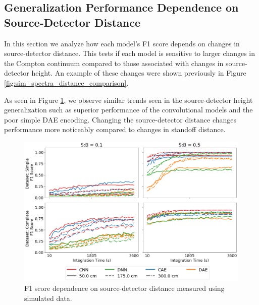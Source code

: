 \subsection{Generalization Performance Dependence on Source-Detector Distance}

In this section we analyze how each model's F1 score depends on changes in source-detector distance. This tests if each model is sensitive to larger changes in the Compton continuum compared to those associated with changes in source-detector height. An example of these changes were shown previously in Figure \ref{fig:sim_spectra_distance_comparison}.

As seen in Figure \ref{fig:sim-generalization-dist}, we observe similar trends seen in the source-detector height generalization such as superior performance of the convolutional models and the poor simple DAE encoding. Changing the source-detector distance changes performance more noticeably compared to changes in standoff distance.


\begin{figure}[H]
	\centering
	\includegraphics[width=1.0\linewidth]{images/sim-generalization-dist}
	\caption{F1 score dependence on source-detector distance measured using simulated data.}
	\label{fig:sim-generalization-dist}
\end{figure}


